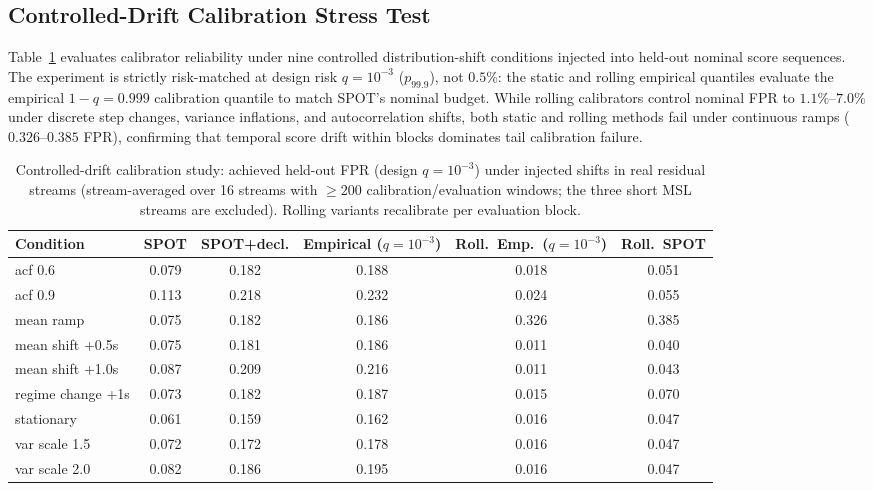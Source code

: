 \subsection{Controlled-Drift Calibration Stress Test}
\label{subsec:controlled_drift_stress_test}
Table~\ref{tab:drift_calibration} evaluates calibrator reliability under nine controlled distribution-shift conditions injected into held-out nominal score sequences. The experiment is strictly risk-matched at design risk $q=10^{-3}$ ($p_{99.9}$), not $0.5\%$: the static and rolling empirical quantiles evaluate the empirical $1-q = 0.999$ calibration quantile to match SPOT's nominal budget. While rolling calibrators control nominal FPR to $1.1\%\text{--}7.0\%$ under discrete step changes, variance inflations, and autocorrelation shifts, both static and rolling methods fail under continuous ramps ($0.326\text{--}0.385$ FPR), confirming that temporal score drift within blocks dominates tail calibration failure.

\begin{table}[t]
\centering
\scriptsize
\caption{Controlled-drift calibration study: achieved held-out FPR (design $q=10^{-3}$) under injected shifts in real residual streams (stream-averaged over 16 streams with $\ge 200$ calibration/evaluation windows; the three short MSL streams are excluded). Rolling variants recalibrate per evaluation block.}\label{tab:drift_calibration}
\scriptsize
\setlength{\tabcolsep}{2.5pt}
\begin{tabular}{@{}lccccc@{}}
\toprule
Condition & SPOT & SPOT+decl. & Empirical ($q=10^{-3}$) & Roll.\ Emp.\ ($q=10^{-3}$) & Roll.\ SPOT \\
\midrule
acf 0.6 & 0.079 & 0.182 & 0.188 & 0.018 & 0.051 \\
acf 0.9 & 0.113 & 0.218 & 0.232 & 0.024 & 0.055 \\
mean ramp & 0.075 & 0.182 & 0.186 & 0.326 & 0.385 \\
mean shift +0.5s & 0.075 & 0.181 & 0.186 & 0.011 & 0.040 \\
mean shift +1.0s & 0.087 & 0.209 & 0.216 & 0.011 & 0.043 \\
regime change +1s & 0.073 & 0.182 & 0.187 & 0.015 & 0.070 \\
stationary & 0.061 & 0.159 & 0.162 & 0.016 & 0.047 \\
var scale 1.5 & 0.072 & 0.172 & 0.178 & 0.016 & 0.047 \\
var scale 2.0 & 0.082 & 0.186 & 0.195 & 0.016 & 0.047 \\
\bottomrule
\end{tabular}
\end{table}

